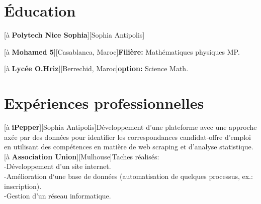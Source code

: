 \documentclass[a4paper]{hamza-cv}
\begin{document}
\begin{textblock}{20.5}
\begin{minipage}[t]{0.37\textwidth}


      

  \end{minipage}\hfill\begin{minipage}[t]{0.61\textwidth}

  
    \section{Éducation}
      \begin{rightenv}
        [à \textbf{Polytech Nice Sophia}][Sophia Antipolis]

        [à \textbf{Mohamed 5}][Casablanca, Maroc]{\textbf{Filière:} Mathématiques physiques MP.}

        [à \textbf{Lycée O.Hriz}][Berrechid, Maroc]{\textbf{option:} Science Math.}
      \end{rightenv}
      
      
\section{Expériences professionnelles}

 

      \begin{rightenv}

        [à \textbf{iPepper}][Sophia Antipolis]{Développement d'une plateforme avec une approche axée par des données pour identifier les correspondances candidat-offre d'emploi en utilisant des compétences en matière de web scraping et d'analyse statistique. }
        [à \textbf{Association Union}][Mulhouse]{Taches réalisés:\\
        -Développement d'un site internet.\\
        -Amélioration d‘une base de données (automatisation de quelques processus, ex.: inscription).\\
        -Gestion d'un réseau informatique.}
        

\end{rightenv}
\end{minipage}
\end{textblock}
\end{document}
